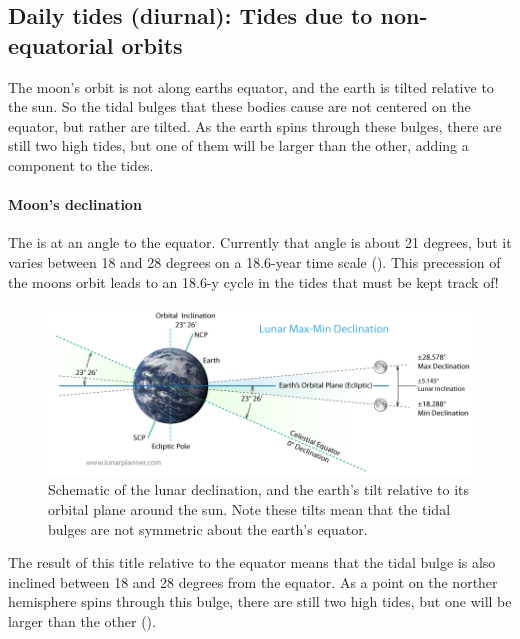 \subsection{Daily tides (diurnal): Tides due to non-equatorial orbits}

The moon's orbit is not along earths equator, and the earth is tilted relative to the sun.  So the tidal bulges that these bodies cause are not centered on the equator, but rather are tilted.  As the earth spins through these bulges, there are still two high tides, but one of them will be larger than the other, adding a  component to the tides.  

\paragraph{Moon's declination} The  is at an angle to the equator.  Currently that angle is about 21 degrees, but it varies between 18 and 28 degrees on a 18.6-year time scale ().  This precession of the moons orbit  leads to an 18.6-y cycle in the tides that must be kept track of!

\begin{figure}[hbt]
  \begin{center}
    \includegraphics{figs/Waves/Lunar-Declination}
    \caption{Schematic of the lunar declination, and the earth's tilt relative to its orbital plane around the sun.  Note these tilts mean that the tidal bulges are not symmetric about the earth's equator.}
    \label{fig:Lunar-Declination}  
  \end{center}
\end{figure}

The result of this title relative to the equator means that the tidal bulge is also inclined between 18 and 28 degrees from the equator.  As a point on the norther hemisphere spins through this bulge, there are still two high tides, but one will be larger than the other ().  

